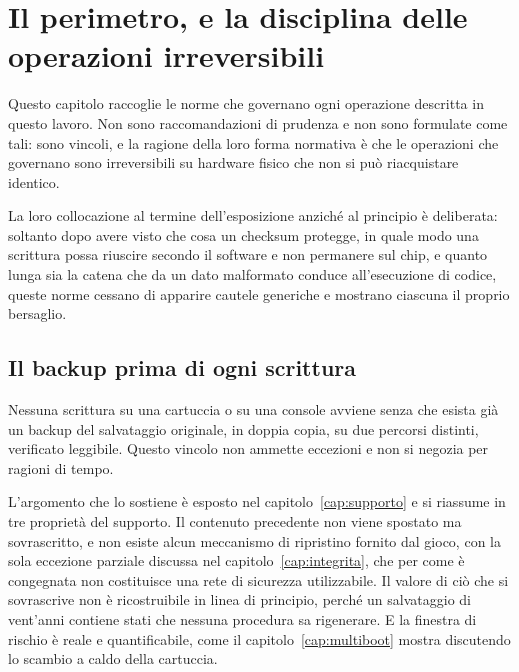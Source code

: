 
\chapter{Il perimetro, e la disciplina delle operazioni irreversibili}
\label{cap:perimetro}

Questo capitolo raccoglie le norme che governano ogni operazione descritta in questo lavoro. Non sono raccomandazioni di prudenza e non sono formulate come tali: sono vincoli, e la ragione della loro forma normativa è che le operazioni che governano sono irreversibili su hardware fisico che non si può riacquistare identico.

La loro collocazione al termine dell'esposizione anziché al principio è deliberata: soltanto dopo avere visto che cosa un checksum protegge, in quale modo una scrittura possa riuscire secondo il software e non permanere sul chip, e quanto lunga sia la catena che da un dato malformato conduce all'esecuzione di codice, queste norme cessano di apparire cautele generiche e mostrano ciascuna il proprio bersaglio.

\section{Il backup prima di ogni scrittura}

Nessuna scrittura su una cartuccia o su una console avviene senza che esista già un backup del salvataggio originale, in doppia copia, su due percorsi distinti, verificato leggibile. Questo vincolo non ammette eccezioni e non si negozia per ragioni di tempo.

L'argomento che lo sostiene è esposto nel capitolo~\ref{cap:supporto} e si riassume in tre proprietà del supporto. Il contenuto precedente non viene spostato ma sovrascritto, e non esiste alcun meccanismo di ripristino fornito dal gioco, con la sola eccezione parziale discussa nel capitolo~\ref{cap:integrita}, che per come è congegnata non costituisce una rete di sicurezza utilizzabile. Il valore di ciò che si sovrascrive non è ricostruibile in linea di principio, perché un salvataggio di vent'anni contiene stati che nessuna procedura sa rigenerare. E la finestra di rischio è reale e quantificabile, come il capitolo~\ref{cap:multiboot} mostra discutendo lo scambio a caldo della cartuccia.

